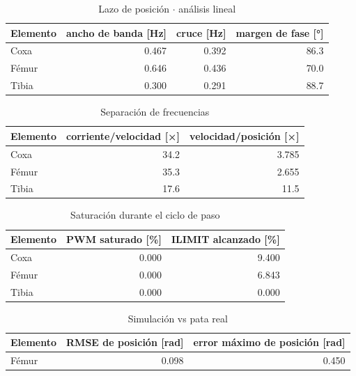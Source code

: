 \begin{table}[htbp]
\centering
\caption{Lazo de posición $\cdot$ análisis lineal}
\begin{tabular}{lrrr}
\toprule
Elemento & ancho de banda [Hz] & cruce [Hz] & margen de fase [°] \\
\midrule
Coxa & 0.467 & 0.392 & 86.3 \\
Fémur & 0.646 & 0.436 & 70.0 \\
Tibia & 0.300 & 0.291 & 88.7 \\
\bottomrule
\end{tabular}
\end{table}

\begin{table}[htbp]
\centering
\caption{Separación de frecuencias}
\begin{tabular}{lrr}
\toprule
Elemento & corriente/velocidad [×] & velocidad/posición [×] \\
\midrule
Coxa & 34.2 & 3.785 \\
Fémur & 35.3 & 2.655 \\
Tibia & 17.6 & 11.5 \\
\bottomrule
\end{tabular}
\end{table}

\begin{table}[htbp]
\centering
\caption{Saturación durante el ciclo de paso}
\begin{tabular}{lrr}
\toprule
Elemento & PWM saturado [\%] & ILIMIT alcanzado [\%] \\
\midrule
Coxa & 0.000 & 9.400 \\
Fémur & 0.000 & 6.843 \\
Tibia & 0.000 & 0.000 \\
\bottomrule
\end{tabular}
\end{table}

\begin{table}[htbp]
\centering
\caption{Simulación vs pata real}
\begin{tabular}{lrr}
\toprule
Elemento & RMSE de posición [rad] & error máximo de posición [rad] \\
\midrule
Fémur & 0.098 & 0.450 \\
\bottomrule
\end{tabular}
\end{table}
